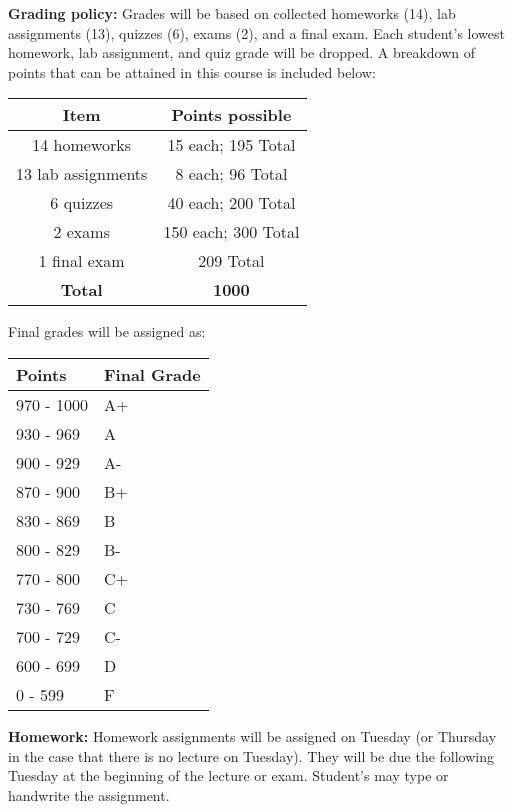 \documentclass{article}
\begin{document}
\noindent\textbf{Grading policy:} 
Grades will be based on collected homeworks (14), lab assignments (13), quizzes (6), exams (2), and a final exam. Each student's lowest homework, lab assignment, and quiz grade will be dropped. A breakdown of points that can be attained in this course is included below:

\begin{center}
	\begin{tabular}{cc}
		\textbf{Item} & \textbf{Points possible} \\
		\hline
		14 homeworks & 15 each; 195 Total\\
		13 lab assignments & 8 each; 96 Total \\
		6 quizzes & 40 each; 200 Total \\
		2 exams & 150 each; 300 Total \\
		1 final exam & 209 Total \\
		\hline
		\textbf{Total} & \textbf{1000}\\
	\end{tabular}
\end{center}

Final grades will be assigned as:
\begin{center}
	\begin{tabular}{p{2cm}p{2.5cm}}
		\textbf{Points} & \textbf{Final Grade} \\ \hline
		970 - 1000 & A+ \\
		930 - 969 & A \\
		900 - 929 & A- \\
		870 - 900 & B+ \\
		830 - 869 & B \\
		800 - 829 & B- \\
		770 - 800 & C+ \\
		730 - 769 & C \\
		700 - 729 & C- \\
		600 - 699 & D \\
		0 - 599 & F \\ \hline
	\end{tabular}
\end{center}

\noindent\textbf{Homework:} Homework assignments will be assigned on Tuesday (or Thursday in the case that there is no lecture on Tuesday). They will be due the following Tuesday at the beginning of the lecture or exam. Student's may type or handwrite the assignment. \\
\end{document}
